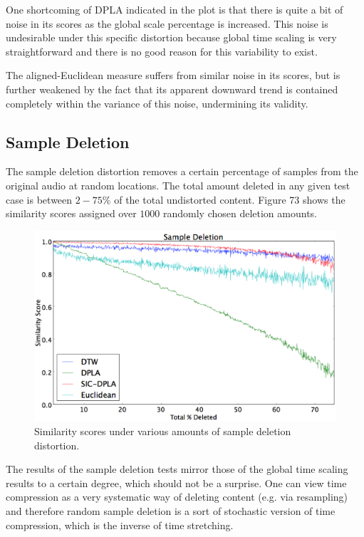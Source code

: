 \documentclass[12pt]{report} 	%
\numberwithin{figure}{chapter}
\numberwithin{table}{chapter}
\numberwithin{equation}{chapter}
\begin{document}
\begin{flushleft}
One shortcoming of DPLA indicated in the plot is that there is quite a bit of noise in its scores as the global scale percentage is increased. This noise is undesirable under this specific distortion because global time scaling is very straightforward and there is no good reason for this variability to exist.

The aligned-Euclidean measure suffers from similar noise in its scores, but is further weakened by the fact that its apparent downward trend is contained completely within the variance of this noise, undermining its validity.

\vspace{12pt}
\subsection{Sample Deletion}
The sample deletion distortion removes a certain percentage of samples from the original audio at random locations. The total amount deleted in any given test case is between $2-75\%$ of the total undistorted content. Figure 73 shows the similarity scores assigned over $1000$ randomly chosen deletion amounts.
\begin{figure}[h!]
\begin{center}
\includegraphics[scale=0.5,width=\linewidth]{SampleDeletion}
\caption[Sample deletion results]{Similarity scores under various amounts of sample deletion distortion.}
\end{center}
\vspace{6pt}
\end{figure}
The results of the sample deletion tests mirror those of the global time scaling results to a certain degree, which should not be a surprise. One can view time compression as a very systematic way of deleting content (e.g. via resampling) and therefore random sample deletion is a sort of stochastic version of time compression, which is the inverse of time stretching. 


\end{flushleft}
\end{document}
